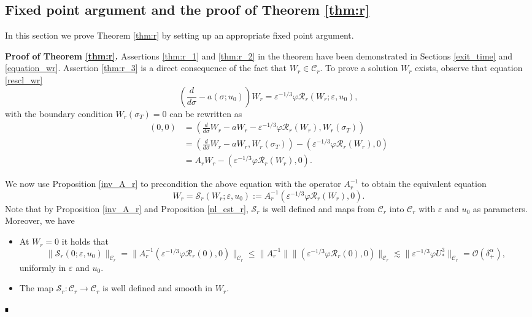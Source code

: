 \documentclass[letterpaper,11pt]{article}
\newcommand{\Ral}{\mathcal{R}}
\newcommand{\rmO}{\mathcal{O}}
\newcommand{\eps}{\varepsilon}
\newcommand{\lar}{ \lesssim }
\numberwithin{equation}{section}
\theoremstyle{plain}
\newenvironment{Proof}[1][.]%
 {\begin{trivlist}\item[]\textbf{Proof#1 }}%
 {\hspace*{\fill}$\rule{0.3\baselineskip}{0.35\baselineskip}$\end{trivlist}}
\begin{document}
\subsection{Fixed point argument and the proof of Theorem \ref{thm:r}}
In this section we prove Theorem \ref{thm:r} by setting up an appropriate fixed point argument.
\begin{Proof}[ of Theorem \ref{thm:r}.]
Assertions \ref{thm:r_1} and \ref{thm:r_2} in the theorem have been demonstrated in Sections \ref{exit_time} and \ref{equation_wr}. Assertion \ref{thm:r_3} is a direct consequence of the fact that $W_r \in \mathcal{C}_r$. To prove a solution $W_r$ exists, observe that equation \eqref{rescl_wr}
\[ 
\left(\frac{d}{d\sigma} - a(\sigma; u_0)\right) W_r =\eps^{-1/3}\varphi \mathcal{R}_r(W_r; \eps,u_0),
\]
with the boundary condition $W_r(\sigma_T)=0$ can be rewritten as 
\begin{align*}
(0,0) &=\left( \frac{d}{d\sigma}W_r-aW_r - \eps^{-1/3}\varphi \Ral_r(W_r), W_r(\sigma_T) \right)\\
&=\left( \frac{d}{d\sigma}W_r-aW_r, W_r(\sigma_T) \right)- \left(\eps^{-1/3}\varphi \Ral_r(W_r), 0 \right)\\
&= A_rW_r - \left(\eps^{-1/3}\varphi \Ral_r(W_r), 0 \right).
\end{align*} 


We now use Proposition \ref{inv_A_r} to precondition the above equation with the operator $A_r^{-1}$ to obtain the equivalent equation
\begin{equation}\label{fix_pt:r}
 W_r = \mathcal{S}_r(W_r;\eps,u_0):= A_r^{-1}(\eps^{-1/3}\varphi \mathcal{R}_r(W_r), 0).
\end{equation}
Note that by Proposition \ref{inv_A_r} and Proposition \ref{nl_est_r}, $\mathcal{S}_r$ is well defined and maps from $\mathcal{C}_r$ into $\mathcal{C}_r$ with $\eps$ and $u_0$ as parameters. Moreover, we have 
\begin{itemize}
\item At $W_r=0$ it holds that
\[
\|\mathcal{S}_r(0;\eps,u_0) \|_{\mathcal{C}_r}= \|A_r^{-1}(\eps^{-1/3}\varphi \mathcal{R}_r(0), 0)\|_{\mathcal{C}_r} \le \|A_r^{-1}\|\|(\eps^{-1/3}\varphi \mathcal{R}_r(0), 0)\|_{\mathcal{C}_r} \lar \| \eps^{-1/3}\varphi U_*^3\|_{\mathcal{C}_r} = \rmO(\delta_+^\alpha),
\]
 uniformly in $\eps$ and $u_0$.

\item The map $\mathcal{S}_r:\mathcal{C}_r \to \mathcal{C}_r$ is well defined and smooth in $W_r$.


\end{itemize}
\end{Proof}
\end{document}

